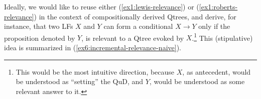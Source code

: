 

Ideally, we would like to reuse either (\ref{ex1:lewis-relevance}) or (\ref{ex1:roberts-relevance}) in the context of compositionally derived Qtrees, and derive, for instance, that two LFs $X$ and $Y$ can form a conditional $X \rightarrow Y$ only if the proposition denoted by $Y$, is relevant to a Qtree evoked by $X$.\footnote{This would be the most intuitive direction, because $X$, as antecedent, would be understood as ``setting'' the QuD, and $Y$, would be understood as some relevant answer to it.} This (stipulative) idea is summarized in (\ref{ex6:incremental-relevance-naive}).

